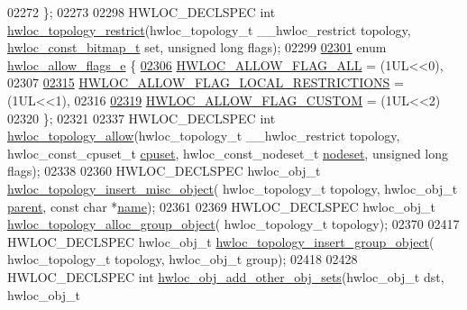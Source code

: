 \begin{DoxyCode}
02272 \};
02273 
02298 HWLOC\_DECLSPEC \textcolor{keywordtype}{int} \hyperlink{a00194_ga6db81ed13ac0a9d70cc80372ab537815}{hwloc\_topology\_restrict}(hwloc\_topology\_t \_\_hwloc\_restrict 
      topology, \hyperlink{a00205_gae991a108af01d408be2776c5b2c467b2}{hwloc\_const\_bitmap\_t} \textcolor{keyword}{set}, \textcolor{keywordtype}{unsigned} \textcolor{keywordtype}{long} flags);
02299 
\hyperlink{a00194_ga38b1be3922094d880f6e76bf56c973d6}{02301} \textcolor{keyword}{enum} \hyperlink{a00194_ga38b1be3922094d880f6e76bf56c973d6}{hwloc\_allow\_flags\_e} \{
\hyperlink{a00194_gga38b1be3922094d880f6e76bf56c973d6aca107692455774f9d323d21b8abfce72}{02306}   \hyperlink{a00194_gga38b1be3922094d880f6e76bf56c973d6aca107692455774f9d323d21b8abfce72}{HWLOC\_ALLOW\_FLAG\_ALL} = (1UL<<0),
02307 
\hyperlink{a00194_gga38b1be3922094d880f6e76bf56c973d6a88c50088c09dcf1e1a496c0817556fb9}{02315}   \hyperlink{a00194_gga38b1be3922094d880f6e76bf56c973d6a88c50088c09dcf1e1a496c0817556fb9}{HWLOC\_ALLOW\_FLAG\_LOCAL\_RESTRICTIONS} = (1UL<<1),
02316 
\hyperlink{a00194_gga38b1be3922094d880f6e76bf56c973d6a489c8c1b67ce7e0b8cf7a665852760e1}{02319}   \hyperlink{a00194_gga38b1be3922094d880f6e76bf56c973d6a489c8c1b67ce7e0b8cf7a665852760e1}{HWLOC\_ALLOW\_FLAG\_CUSTOM} = (1UL<<2)
02320 \};
02321 
02337 HWLOC\_DECLSPEC \textcolor{keywordtype}{int} \hyperlink{a00194_gaf955b190c0299dcfb5bc985d777f92a1}{hwloc\_topology\_allow}(hwloc\_topology\_t \_\_hwloc\_restrict topology, 
      hwloc\_const\_cpuset\_t \hyperlink{a00238_a67925e0f2c47f50408fbdb9bddd0790f}{cpuset}, hwloc\_const\_nodeset\_t \hyperlink{a00238_a08f0d0e16c619a6e653526cbee4ffea3}{nodeset}, \textcolor{keywordtype}{unsigned} \textcolor{keywordtype}{long} flags);
02338 
02360 HWLOC\_DECLSPEC hwloc\_obj\_t \hyperlink{a00194_gad980782ade737900c5cf208946768c30}{hwloc\_topology\_insert\_misc\_object}(
      hwloc\_topology\_t topology, hwloc\_obj\_t \hyperlink{a00238_adc494f6aed939992be1c55cca5822900}{parent}, \textcolor{keyword}{const} \textcolor{keywordtype}{char} *\hyperlink{a00238_abb709ec38f2970677e4e57d1d30be96d}{name});
02361 
02369 HWLOC\_DECLSPEC hwloc\_obj\_t \hyperlink{a00194_ga4cea4741165faf5323931a9ed8786ef7}{hwloc\_topology\_alloc\_group\_object}(
      hwloc\_topology\_t topology);
02370 
02417 HWLOC\_DECLSPEC hwloc\_obj\_t \hyperlink{a00194_ga1fc6012b3e1c249b83f48cb7bcacaa5b}{hwloc\_topology\_insert\_group\_object}(
      hwloc\_topology\_t topology, hwloc\_obj\_t group);
02418 
02428 HWLOC\_DECLSPEC \textcolor{keywordtype}{int} \hyperlink{a00194_gad458715d3335df44849216cc123d1055}{hwloc\_obj\_add\_other\_obj\_sets}(hwloc\_obj\_t dst, hwloc\_obj\_t 

\end{DoxyCode}
